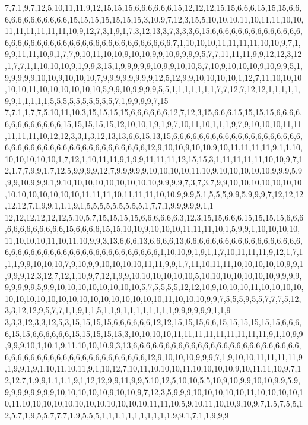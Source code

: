 7,7,1,9,7,12,5,10,11,11,9,12,15,15,15,6,6,6,6,6,6,15,12,12,12,15,15,6,6,6,15,15,15,6,6,6,6,6,6,6,6,6,6,6,6,15,15,15,15,15,15,15,3,10,9,7,12,3,15,5,10,10,10,11,10,11,11,10,10,11,11,11,11,11,11,10,9,12,7,3,1,9,1,7,3,12,13,3,7,3,3,3,6,15,6,6,6,6,6,6,6,6,6,6,6,6,6,6,6,6,6,6,6,6,6,6,6,6,6,6,6,6,6,6,6,6,6,6,6,6,6,6,6,6,7,1,10,10,10,11,11,11,11,10,10,9,7,1,9,9,11,11,10,9,1,7,7,9,10,11,10,10,9,10,10,9,9,10,9,9,9,9,5,7,7,11,11,11,9,9,12,12,3,12,1,7,7,1,1,10,10,10,9,1,9,9,3,15,1,9,9,9,9,9,10,9,9,10,10,5,7,10,9,10,10,10,9,10,9,9,5,1,9,9,9,9,9,10,10,9,10,10,10,7,9,9,9,9,9,9,9,9,12,5,12,9,9,10,10,10,10,1,12,7,11,10,10,10,10,10,11,10,10,10,10,10,10,5,9,9,10,9,9,9,9,5,5,1,1,1,1,1,1,1,7,7,12,7,12,12,1,1,1,1,1,9,9,1,1,1,1,1,5,5,5,5,5,5,5,5,5,5,7,1,9,9,9,9,7,15
7,7,1,1,7,7,5,10,11,10,3,15,15,15,15,6,6,6,6,6,6,12,7,12,3,15,6,6,6,15,15,15,15,6,6,6,6,6,6,6,6,6,6,6,6,6,15,15,15,15,15,12,10,10,1,9,1,9,7,10,11,10,1,1,1,9,7,9,10,10,10,11,11,11,11,11,10,12,12,3,3,1,3,12,13,13,6,6,15,13,15,6,6,6,6,6,6,6,6,6,6,6,6,6,6,6,6,6,6,6,6,6,6,6,6,6,6,6,6,6,6,6,6,6,6,6,6,6,6,6,6,6,6,12,9,10,10,9,10,10,9,10,11,11,11,11,9,1,1,10,10,10,10,10,10,1,7,12,1,10,11,11,9,1,9,9,11,11,11,12,15,15,3,1,11,11,11,11,10,10,9,7,12,1,7,7,9,9,1,7,12,5,9,9,9,9,12,7,9,9,9,9,9,10,10,10,10,11,10,9,10,10,10,10,10,9,9,9,5,9,9,9,10,9,9,9,1,9,10,10,10,10,10,10,10,10,10,9,9,9,9,7,3,7,3,7,9,9,10,10,10,10,10,10,10,10,10,10,10,10,10,10,11,11,11,10,11,11,11,10,10,9,9,9,5,1,5,5,5,9,9,5,9,9,9,7,12,12,12,12,12,7,1,9,9,1,1,1,9,1,5,5,5,5,5,5,5,5,5,1,7,7,1,9,9,9,9,9,1,1
12,12,12,12,12,12,5,10,5,7,15,15,15,15,6,6,6,6,6,6,3,12,3,15,15,6,6,6,15,15,15,15,6,6,6,6,6,6,6,6,6,6,6,6,15,6,6,6,6,15,15,10,10,9,10,10,10,11,11,11,10,1,5,9,9,1,10,10,10,10,11,10,10,10,11,10,11,10,9,9,3,13,6,6,6,13,6,6,6,6,13,6,6,6,6,6,6,6,6,6,6,6,6,6,6,6,6,6,6,6,6,6,6,6,6,6,6,6,6,6,6,6,6,6,6,6,6,6,6,6,6,6,6,1,10,10,9,1,9,1,1,7,10,11,11,11,9,12,1,7,1,1,1,9,9,10,10,10,7,9,10,9,9,10,10,10,10,11,11,9,9,1,7,11,10,11,11,10,10,10,10,10,9,9,1,9,9,9,12,3,12,7,12,1,10,9,7,12,1,9,9,10,10,10,10,10,10,5,10,10,10,10,10,10,10,9,9,9,9,9,9,9,9,9,5,9,9,10,10,10,10,10,10,10,10,5,7,5,5,5,5,12,12,10,9,10,10,10,11,10,10,10,10,10,10,10,10,10,10,10,10,10,10,10,10,10,10,10,11,10,10,10,9,9,7,5,5,5,9,5,5,7,7,7,5,12,3,3,12,12,9,5,7,7,1,1,9,1,1,5,1,1,9,1,1,1,1,1,1,1,1,9,9,9,9,9,9,1,1,9
3,3,3,12,3,3,12,5,3,15,15,15,15,6,6,6,6,6,6,12,12,15,15,15,6,6,15,15,15,15,15,15,6,6,6,6,15,15,6,6,6,6,6,6,15,15,15,15,15,3,10,10,10,10,11,11,11,11,11,11,11,11,11,9,1,10,9,9,9,9,9,10,1,10,1,9,11,10,10,10,9,3,13,6,6,6,6,6,6,6,6,6,6,6,6,6,6,6,6,6,6,6,6,6,6,6,6,6,6,6,6,6,6,6,6,6,6,6,6,6,6,6,6,6,6,6,6,6,6,6,6,12,9,10,10,10,9,9,9,7,1,9,10,10,11,11,11,11,9,1,9,9,1,9,1,10,11,10,11,9,1,10,12,7,10,11,10,10,10,11,10,10,10,10,9,10,11,11,10,9,7,12,12,7,1,9,9,1,1,1,1,9,1,12,12,9,9,11,9,9,5,10,12,5,10,10,5,5,10,9,10,9,9,10,10,9,9,5,9,9,9,9,9,9,9,9,9,10,10,10,10,10,9,10,10,9,7,12,3,5,9,9,9,10,10,10,10,10,11,10,10,10,10,10,11,10,10,10,10,10,10,10,10,10,10,10,10,11,11,10,5,9,10,11,10,10,9,10,9,7,1,5,7,5,5,12,5,7,1,9,5,5,7,7,7,1,9,5,5,5,1,1,1,1,1,1,1,1,1,1,1,9,9,1,7,1,1,9,9,9
